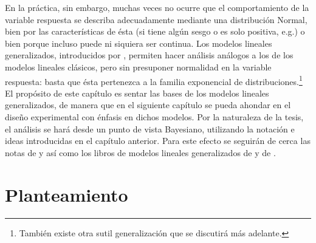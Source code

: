 

En la práctica, sin embargo, muchas veces no ocurre que el comportamiento de la variable respuesta se describa adecuadamente mediante una distribución Normal, bien por las características de ésta (si tiene algún sesgo o es solo positiva, e.g.) o bien porque incluso puede ni siquiera ser continua. Los modelos lineales generalizados, introducidos por \cite{nelder_wedderburn}, permiten hacer análisis análogos a los de los modelos lineales clásicos, pero sin presuponer normalidad en la variable respuesta: basta que ésta pertenezca a la familia exponencial de distribuciones.\footnote{También existe otra sutil generalización que se discutirá más adelante.}\\


El propósito de este capítulo es sentar las bases de los modelos lineales generalizados, de manera que en el siguiente capítulo se pueda ahondar en el diseño experimental con énfasis en dichos modelos. Por la naturaleza de la tesis, el análisis se hará desde un punto de vista Bayesiano, utilizando la notación e ideas introducidas en el capítulo anterior. Para este efecto se seguirán de cerca las notas de \cite{notas_lm_egp} y \cite{notas_glm_lnieto} así como los libros de modelos lineales generalizados de \cite{glm_bayesian_view} y de \cite{nelder_glm}.


\section{Planteamiento}


